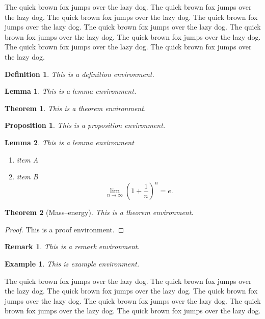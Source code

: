 \documentclass[openany,twoside,12pt]{book}
\theoremstyle{plain}
\newtheorem{definition}{Definition}[chapter]
\newtheorem{proposition}{Proposition}[chapter]
\newtheorem{lemma}{Lemma}[chapter]
\newtheorem{theorem}{Theorem}[chapter]
\newtheorem{example}{Example}[chapter]
\newtheorem{remark}{Remark}[chapter]
\numberwithin{equation}{chapter}
\numberwithin{figure}{chapter}
\numberwithin{table}{chapter}
\begin{document}
The quick brown fox jumps over the lazy dog. The quick brown fox jumps over the lazy dog. The quick brown fox jumps over the lazy dog. The quick brown fox jumps over the lazy dog. The quick brown fox jumps over the lazy dog. The quick brown fox jumps over the lazy dog. The quick brown fox jumps over the lazy dog. The quick brown fox jumps over the lazy dog. The quick brown fox jumps over the lazy dog.

\begin{definition}
This is a definition environment.
\end{definition}

\begin{lemma}
This is a lemma environment.
\end{lemma}

\begin{theorem}
This is a theorem environment.
\end{theorem}

\begin{proposition}
This is a proposition environment.
\end{proposition}

\begin{lemma}
This is a lemma environment
\begin{enumerate}[label={\upshape(\roman*)}]
  \item item A
  \item item B
  \begin{equation}\label{eq:limite}
    \lim_{n\to\infty}\left(1+\frac{1}{n}\right)^n=e.
  \end{equation}
\end{enumerate}
\end{lemma}

\begin{theorem}[Mass--energy]
This is a theorem environment.
\end{theorem}
\begin{proof}
  This is a proof environment.
\end{proof}

\begin{remark}
  This is a remark environment.
\end{remark}

\begin{example}
  This is example environment.
\end{example}

The quick brown fox jumps over the lazy dog. The quick brown fox jumps over the lazy dog. The quick brown fox jumps over the lazy dog. The quick brown fox jumps over the lazy dog. The quick brown fox jumps over the lazy dog. The quick brown fox jumps over the lazy dog. The quick brown fox jumps over the lazy dog.
\end{document}
